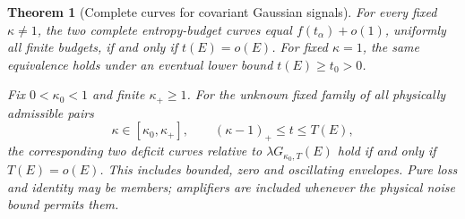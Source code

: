 \documentclass[11pt]{article}
\newtheorem{theorem}{Theorem}
\begin{document}
\begin{theorem}[Complete curves for covariant Gaussian signals]
\label{thm:generalU}
For every fixed \(\kappa\ne1\), the two complete entropy-budget
curves equal \(f(t_\alpha)+o(1)\), uniformly all finite budgets,
if and only if \(t(E)=o(E)\).
For fixed \(\kappa=1\), the same equivalence holds under an eventual
lower bound \(t(E)\ge t_0>0\).

Fix \(0<\kappa_0<1\) and finite \(\kappa_+\ge1\). For the unknown
fixed family of all physically admissible pairs
\[
 \kappa\in[\kappa_0,\kappa_+],\qquad
 (\kappa-1)_+\le t\le T(E),
\]
the corresponding two deficit curves relative to
\(\lambda G_{\kappa_0,T}(E)\) hold if and only if \(T(E)=o(E)\).
This includes bounded, zero and oscillating envelopes. Pure loss and
identity may be members; amplifiers are included whenever the physical
noise bound permits them.
\end{theorem}
\end{document}
